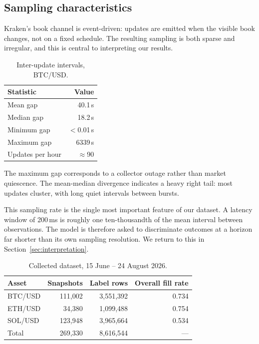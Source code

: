 \documentclass[11pt]{article}
\begin{document}
\subsection{Sampling characteristics}

Kraken's book channel is event-driven: updates are emitted when the visible book
changes, not on a fixed schedule. The resulting sampling is both sparse and
irregular, and this is central to interpreting our results.

\begin{table}[h]
\centering
\caption{Inter-update intervals, BTC/USD.}
\label{tab:gaps}
\begin{tabular}{lr}
\toprule
Statistic & Value \\
\midrule
Mean gap            & 40.1\,s \\
Median gap          & 18.2\,s \\
Minimum gap         & $<$0.01\,s \\
Maximum gap         & 6339\,s \\
Updates per hour    & $\approx$90 \\
\bottomrule
\end{tabular}
\end{table}

\noindent
The maximum gap corresponds to a collector outage rather than market quiescence.
The mean-median divergence indicates a heavy right tail: most updates cluster,
with long quiet intervals between bursts.

This sampling rate is the single most important feature of our dataset. A
latency window of 200\,ms is roughly one ten-thousandth of the mean interval
between observations. The model is therefore asked to discriminate outcomes at a horizon far shorter
than its own sampling resolution. We return to this in
Section~\ref{sec:interpretation}.

\begin{table}[h]
\centering
\caption{Collected dataset, 15 June -- 24 August 2026.}
\label{tab:data}
\begin{tabular}{lrrr}
\toprule
Asset & Snapshots & Label rows & Overall fill rate \\
\midrule
BTC/USD & 111{,}002 & 3{,}551{,}392 & 0.734 \\
ETH/USD &  34{,}380 & 1{,}099{,}488 & 0.754 \\
SOL/USD & 123{,}948 & 3{,}965{,}664 & 0.534 \\
\midrule
Total   & 269{,}330 & 8{,}616{,}544 & --- \\
\bottomrule
\end{tabular}
\end{table}
\end{document}
